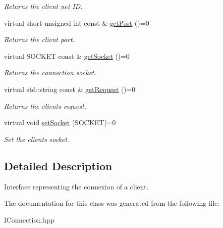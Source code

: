 \begin{DoxyCompactItemize}
\begin{DoxyCompactList}\small\item\em Returns the client net I\+D. \end{DoxyCompactList}\item 
\hypertarget{class_i_connection_af6f529a8eea2e30017ba2ec9f43f214b}{}virtual short unsigned int const \& \hyperlink{class_i_connection_af6f529a8eea2e30017ba2ec9f43f214b}{get\+Port} ()=0\label{class_i_connection_af6f529a8eea2e30017ba2ec9f43f214b}

\begin{DoxyCompactList}\small\item\em Returns the client port. \end{DoxyCompactList}\item 
\hypertarget{class_i_connection_a09349b5ba8ce8e381cf34ab12ba40c9c}{}virtual S\+O\+C\+K\+E\+T const \& \hyperlink{class_i_connection_a09349b5ba8ce8e381cf34ab12ba40c9c}{get\+Socket} ()=0\label{class_i_connection_a09349b5ba8ce8e381cf34ab12ba40c9c}

\begin{DoxyCompactList}\small\item\em Returns the connection socket. \end{DoxyCompactList}\item 
\hypertarget{class_i_connection_a78d5be69e5e26c7645b04a1903b1557d}{}virtual std\+::string const \& \hyperlink{class_i_connection_a78d5be69e5e26c7645b04a1903b1557d}{get\+Request} ()=0\label{class_i_connection_a78d5be69e5e26c7645b04a1903b1557d}

\begin{DoxyCompactList}\small\item\em Returns the client\textquotesingle{}s request. \end{DoxyCompactList}\item 
\hypertarget{class_i_connection_a7efb00e9c99e0eac30f5005aca9ed571}{}virtual void \hyperlink{class_i_connection_a7efb00e9c99e0eac30f5005aca9ed571}{set\+Socket} (S\+O\+C\+K\+E\+T)=0\label{class_i_connection_a7efb00e9c99e0eac30f5005aca9ed571}

\begin{DoxyCompactList}\small\item\em Set the client\textquotesingle{}s socket. \end{DoxyCompactList}\end{DoxyCompactItemize}


\subsection{Detailed Description}
Interface representing the connexion of a client. 

The documentation for this class was generated from the following file\+:\begin{DoxyCompactItemize}
\item 
I\+Connection.\+hpp\end{DoxyCompactItemize}
